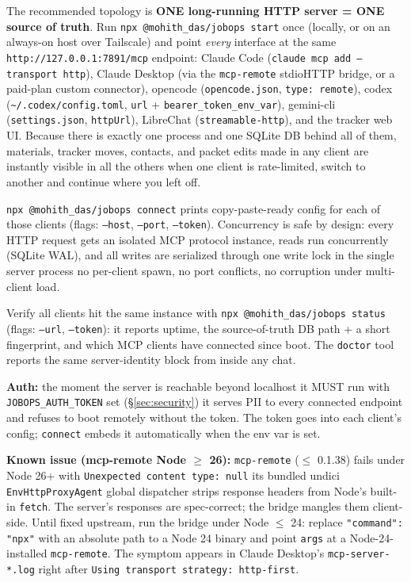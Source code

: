 \documentclass[11pt,letterpaper]{article}
\newcommand{\tool}[1]{\texttt{#1}}
\newcommand{\flag}[1]{\texttt{#1}}
\newcommand{\fpath}[1]{\texttt{#1}}
\newcommand{\env}[1]{\texttt{#1}}
\newcommand{\cmd}[1]{\texttt{#1}}
\begin{document}
The recommended topology is \textbf{ONE long-running HTTP server = ONE source of truth}. Run \cmd{npx @mohith\_das/jobops start} once (locally, or on an always-on host over Tailscale) and point \emph{every} interface at the same \texttt{http://127.0.0.1:7891/mcp} endpoint: Claude Code (\cmd{claude mcp add --transport http}), Claude Desktop (via the \texttt{mcp-remote} stdio\textrightarrow{}HTTP bridge, or a paid-plan custom connector), opencode (\fpath{opencode.json}, \texttt{type: remote}), codex (\fpath{\textasciitilde/.codex/config.toml}, \texttt{url} + \texttt{bearer\_token\_env\_var}), gemini-cli (\fpath{settings.json}, \texttt{httpUrl}), LibreChat (\texttt{streamable-http}), and the tracker web UI. Because there is exactly one process and one SQLite DB behind all of them, materials, tracker moves, contacts, and packet edits made in any client are instantly visible in all the others \textemdash{} when one client is rate-limited, switch to another and continue where you left off.

\cmd{npx @mohith\_das/jobops connect} prints copy-paste-ready config for each of those clients (flags: \flag{--host}, \flag{--port}, \flag{--token}). Concurrency is safe by design: every HTTP request gets an isolated MCP protocol instance, reads run concurrently (SQLite WAL), and all writes are serialized through one write lock in the single server process \textemdash{} no per-client spawn, no port conflicts, no corruption under multi-client load.

Verify all clients hit the same instance with \cmd{npx @mohith\_das/jobops status} (flags: \flag{--url}, \flag{--token}): it reports uptime, the source-of-truth DB path + a short fingerprint, and which MCP clients have connected since boot. The \tool{doctor} tool reports the same server-identity block from inside any chat.

\textbf{Auth:} the moment the server is reachable beyond localhost it MUST run with \env{JOBOPS\_AUTH\_TOKEN} set (\S\ref{sec:security}) \textemdash{} it serves PII to every connected endpoint and refuses to boot remotely without the token. The token goes into each client's config; \cmd{connect} embeds it automatically when the env var is set.

\textbf{Known issue (mcp-remote \texttimes{} Node $\geq$ 26):} \texttt{mcp-remote} ($\leq$ 0.1.38) fails under Node 26+ with \texttt{Unexpected content type: null} \textemdash{} its bundled undici \texttt{EnvHttpProxyAgent} global dispatcher strips response headers from Node's built-in \texttt{fetch}. The server's responses are spec-correct; the bridge mangles them client-side. Until fixed upstream, run the bridge under Node $\leq$ 24: replace \texttt{"command": "npx"} with an absolute path to a Node 24 binary and point \texttt{args} at a Node-24-installed \texttt{mcp-remote}. The symptom appears in Claude Desktop's \fpath{mcp-server-*.log} right after \texttt{Using transport strategy: http-first}.
\end{document}
